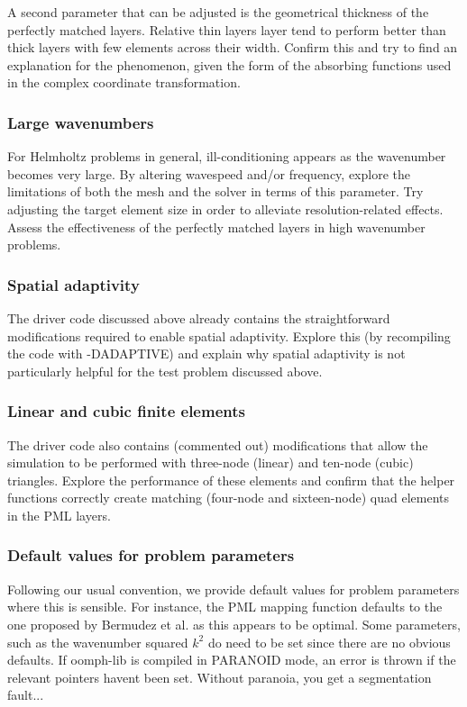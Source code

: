A second parameter that can be adjusted is the geometrical thickness of the perfectly matched layers. Relative thin layers layer tend to perform better than thick layers with few elements across their width. Confirm this and try to find an explanation for the phenomenon, given the form of the absorbing functions used in the complex coordinate transformation.\hypertarget{index_large_k}{}\subsubsection{Large wavenumbers}\label{index_large_k}
For Helmholtz problems in general, ill-\/conditioning appears as the wavenumber becomes very large. By altering wavespeed and/or frequency, explore the limitations of both the mesh and the solver in terms of this parameter. Try adjusting the target element size in order to alleviate resolution-\/related effects. Assess the effectiveness of the perfectly matched layers in high wavenumber problems.\hypertarget{index_adaptivity}{}\subsubsection{Spatial adaptivity}\label{index_adaptivity}
The driver code discussed above already contains the straightforward modifications required to enable spatial adaptivity. Explore this (by recompiling the code with -\/\+D\+A\+D\+A\+P\+T\+I\+VE) and explain why spatial adaptivity is not particularly helpful for the test problem discussed above.\hypertarget{index_diff_order}{}\subsubsection{Linear and cubic finite elements}\label{index_diff_order}
The driver code also contains (commented out) modifications that allow the simulation to be performed with three-\/node (linear) and ten-\/node (cubic) triangles. Explore the performance of these elements and confirm that the helper functions correctly create matching (four-\/node and sixteen-\/node) quad elements in the P\+ML layers.\hypertarget{index_default}{}\subsubsection{Default values for problem parameters}\label{index_default}
Following our usual convention, we provide default values for problem parameters where this is sensible. For instance, the P\+ML mapping function defaults to the one proposed by Bermudez et al. as this appears to be optimal. Some parameters, such as the wavenumber squared $ k^2 $ do need to be set since there are no obvious defaults. If {\ttfamily oomph-\/lib} is compiled in {\ttfamily P\+A\+R\+A\+N\+O\+ID} mode, an error is thrown if the relevant pointers haven\textquotesingle{}t been set. Without paranoia, you get a segmentation fault...

